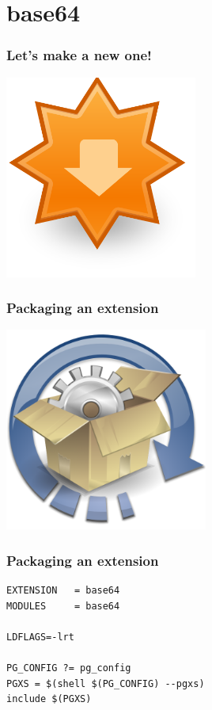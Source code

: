 \documentclass{beamer}
\begin{document}
\section{base64}

\begin{frame}[fragile]
  \frametitle{Let's make a new one!}

\begin{center}
  \includegraphics[height=18em]{extension-update.png}
\end{center}
\end{frame}

\begin{frame}[fragile]
  \frametitle{Packaging an extension}

\begin{center}
  \includegraphics[height=18em]{software-upgrade.png}
\end{center}
\end{frame}

\begin{frame}[fragile]
  \frametitle{Packaging an extension}

  \vfill

\begin{verbatim}
EXTENSION   = base64
MODULES     = base64

LDFLAGS=-lrt

PG_CONFIG ?= pg_config
PGXS = $(shell $(PG_CONFIG) --pgxs)
include $(PGXS)
\end{verbatim}
\end{frame}

\end{document}
